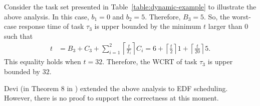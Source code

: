 \begin{example}
\label{ex:suspension-blocking}    
Consider the task set presented in Table~\ref{table:dynamic-example} to illustrate the above analysis. In this case, $b_1 = 0$ and $b_2 = 5$. Therefore, $B_3 = 5$. So, the worst-case response time of task $\tau_3$ is upper bounded by the minimum $t$ larger than $0$ such that 
\begin{align*}
t & = B_3+C_3+\sum_{i=1}^2 \left\lceil \frac{t}{T_i} \right\rceil C_i = 6+\left\lceil \frac{t}{2} \right\rceil 1 +\left\lceil \frac{t}{20} \right\rceil 5.
\end{align*} 
This equality holds when $t=32$. Therefore, the WCRT of task $\tau_{3}$ is upper bounded by $32$.
\hfill\myendproof  
\end{example}



Devi (in Theorem 8 in \cite[Section 4.5]{DBLP:conf/ecrts/Devi03}) extended the above analysis to
EDF scheduling. However, there is no proof to support the correctness at this moment.


\label{sec:model-interfering-unified}

